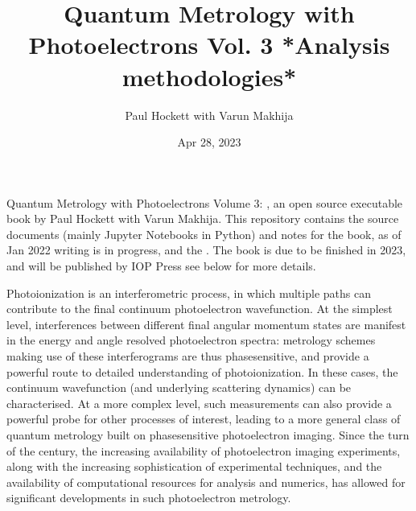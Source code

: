 \documentclass[letterpaper,table,10pt,english]{jupyterBook}
\title{Quantum Metrology with Photoelectrons Vol. 3 *Analysis methodologies*}
\date{Apr 28, 2023}
\author{Paul Hockett with Varun Makhija}
\begin{document}
\pagestyle{empty}
\sphinxmaketitle
\pagestyle{plain}
\sphinxtableofcontents
\pagestyle{normal}
\label{\detokenize{intro::doc}}


\sphinxAtStartPar
Quantum Metrology with Photoelectrons Volume 3: , an open source executable book by Paul Hockett with Varun Makhija. This repository contains the source documents (mainly Jupyter Notebooks in Python) and notes for the book, as of Jan 2022 writing is in progress, and the . The book is due to be finished in 2023, and will be published by IOP Press \sphinxhyphen{} see below for more details.

\begin{DUlineblock}{0em}
\item[] 
\end{DUlineblock}

\sphinxAtStartPar
Photoionization is an interferometric process, in which multiple paths can contribute to the final continuum photoelectron wavefunction. At the simplest level, interferences between different final angular momentum states are manifest in the energy and angle resolved photoelectron spectra: metrology schemes making use of these interferograms are thus phase\sphinxhyphen{}sensitive, and provide a powerful route to detailed understanding of photoionization. In these cases, the continuum wavefunction (and underlying scattering dynamics) can be characterised. At a more complex level, such measurements can also provide a powerful probe for other processes of interest, leading to a more general class of quantum metrology built on phase\sphinxhyphen{}sensitive photoelectron imaging.  Since the turn of the century, the increasing availability of photoelectron imaging experiments, along with the increasing sophistication of experimental techniques, and the availability of computational resources for analysis and numerics, has allowed for significant developments in such photoelectron metrology.

\begin{DUlineblock}{0em}
\item[] 
\end{DUlineblock}
\end{document}
